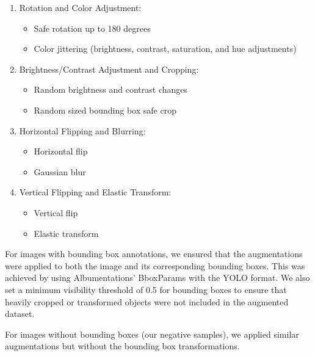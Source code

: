 \begin{enumerate}
    \item Rotation and Color Adjustment:
    \begin{itemize}
        \item Safe rotation up to 180 degrees
        \item Color jittering (brightness, contrast, saturation, and hue adjustments)
    \end{itemize}
    
    \item Brightness/Contrast Adjustment and Cropping:
    \begin{itemize}
        \item Random brightness and contrast changes
        \item Random sized bounding box safe crop
    \end{itemize}
    
    \item Horizontal Flipping and Blurring:
    \begin{itemize}
        \item Horizontal flip
        \item Gaussian blur
    \end{itemize}
    
    \item Vertical Flipping and Elastic Transform:
    \begin{itemize}
        \item Vertical flip
        \item Elastic transform
    \end{itemize}
\end{enumerate}


For images with bounding box annotations, we ensured that the augmentations were applied to both the image and its corresponding bounding boxes. This was achieved by using Albumentations' BboxParams with the YOLO format. We also set a minimum visibility threshold of 0.5 for bounding boxes to ensure that heavily cropped or transformed objects were not included in the augmented dataset.

For images without bounding boxes (our negative samples), we applied similar augmentations but without the bounding box transformations.

